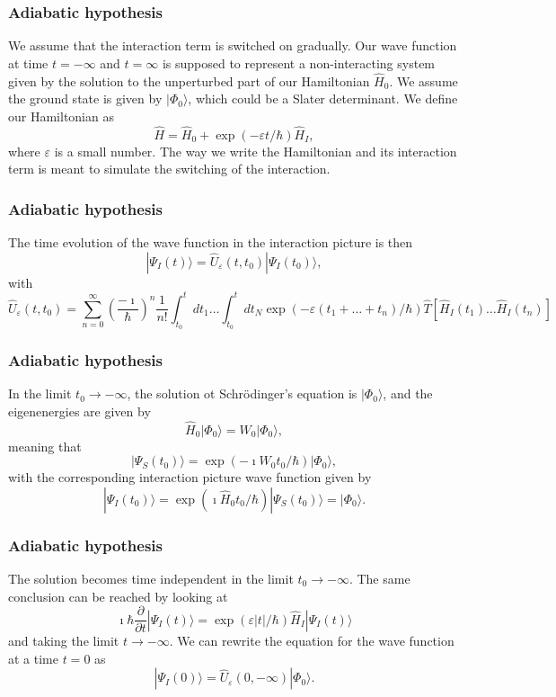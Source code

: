 \documentclass[compress]{beamer}
\begin{document}
\frame
{
\frametitle{Adiabatic hypothesis}
\begin{small}
{\scriptsize
We assume that the interaction term is switched on gradually. Our wave function at time $t=-\infty$ and $t=\infty$ is supposed to represent a non-interacting system
given by the solution to the unperturbed part of our Hamiltonian $\hat{H}_0$.
We assume the ground state is given by $|\Phi_0\rangle$, which could be a Slater determinant.
We define our Hamiltonian as
\[
\hat{H}=\hat{H}_0+\exp{(-\varepsilon t/\hbar)}\hat{H}_I,
\]
where $\varepsilon$ is a small number. The way we write the Hamiltonian 
and its interaction term is meant to simulate the switching of the interaction.
}
\end{small}
}
\frame
{
\frametitle{Adiabatic hypothesis}
\begin{small}
{\scriptsize
The time evolution of the wave function in the interaction picture is then
\[
|\Psi_I(t) \rangle = \hat{U}_{\varepsilon}(t,t_0)|\Psi_I(t_0)\rangle,
\]
with 
\[
\hat{U}_{\varepsilon}(t,t_0)=\sum_{n=0}^{\infty}\left(\frac{-\imath}{\hbar}\right)^n\frac{1}{n!}
\int_{t_0}^t dt_1\dots \int_{t_0}^t dt_N \exp{(-\varepsilon(t_1+\dots+t_n)/\hbar)}\hat{T}\left[\hat{H}_I(t_1)\dots\hat{H}_I(t_n)\right]
\]
}
\end{small}
}
\frame
{
\frametitle{Adiabatic hypothesis}
\begin{small}
{\scriptsize
In the limit $t_0\rightarrow -\infty$, the solution ot Schr\"odinger's equation is
$|\Phi_0\rangle$, and the eigenenergies are given by 
\[
\hat{H}_0|\Phi_0\rangle=W_0|\Phi_0\rangle,
\]
meaning that 
\[
|\Psi_S(t_0)\rangle = \exp{(-\imath W_0t_0/\hbar)}|\Phi_0\rangle,
\]
with the corresponding interaction picture wave function given by
\[
|\Psi_I(t_0)\rangle = \exp{(\imath \hat{H}_0t_0/\hbar)}|\Psi_S(t_0)\rangle=|\Phi_0\rangle.
\]
}
\end{small}
}
\frame
{
\frametitle{Adiabatic hypothesis}
\begin{small}
{\scriptsize
The solution becomes time independent in the limit $t_0\rightarrow -\infty$.
The same conclusion can be reached by looking at 
\[
\imath \hbar\frac{\partial }{\partial t}|\Psi_I(t)\rangle =
\exp{(\varepsilon |t|/\hbar)}\hat{H}_I|\Psi_I(t)\rangle 
\]
and taking the limit $t\rightarrow -\infty$.
We can rewrite the equation for the wave function at a time $t=0$ as
\[
|\Psi_I(0) \rangle = \hat{U}_{\varepsilon}(0,-\infty)|\Phi_0\rangle.
\]
}
\end{small}
}
\frame
\end{document}
